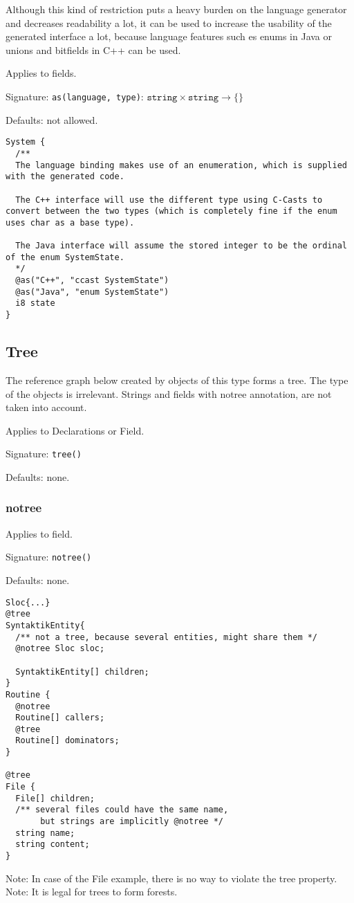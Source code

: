 \documentclass[a4paper,10pt]{article}
\begin{document}
Although this kind of restriction puts a heavy burden on the language generator and decreases readability a lot, it can be used to increase the usability of the generated interface a lot, because language features such es enums in Java or unions and bitfields in C++ can be used.

Applies to fields.

Signature: \verb/as(language, type)/: $\texttt{string} \times \texttt{string} → \{\}$

Defaults: not allowed.

\begin{lstlisting}[label=ascriptionExample,caption=Examples,language=skill]
System {
  /**
  The language binding makes use of an enumeration, which is supplied with the generated code.
  
  The C++ interface will use the different type using C-Casts to convert between the two types (which is completely fine if the enum uses char as a base type).
  
  The Java interface will assume the stored integer to be the ordinal of the enum SystemState.
  */
  @as("C++", "ccast SystemState")
  @as("Java", "enum SystemState")
  i8 state
}
\end{lstlisting}



\subsection*{Tree}
The reference graph below created by objects of this type forms a tree. The type of the objects is irrelevant. Strings and fields with notree annotation, are not taken into account.

Applies to Declarations or Field.

Signature: \verb/tree()/

Defaults: none.


\subsubsection*{notree}
Applies to field.

Signature: \verb/notree()/

Defaults: none.

\begin{lstlisting}[label=treeExample,caption=Examples,language=skill]
Sloc{...}
@tree
SyntaktikEntity{
  /** not a tree, because several entities, might share them */
  @notree Sloc sloc;
  
  SyntaktikEntity[] children;
}
Routine {
  @notree
  Routine[] callers;
  @tree
  Routine[] dominators;
}

@tree
File {
  File[] children;
  /** several files could have the same name,
       but strings are implicitly @notree */
  string name;
  string content;
} 
\end{lstlisting}
Note: In case of the File example, there is no way to violate the tree property.
Note: It is legal for trees to form forests.
\end{document}
